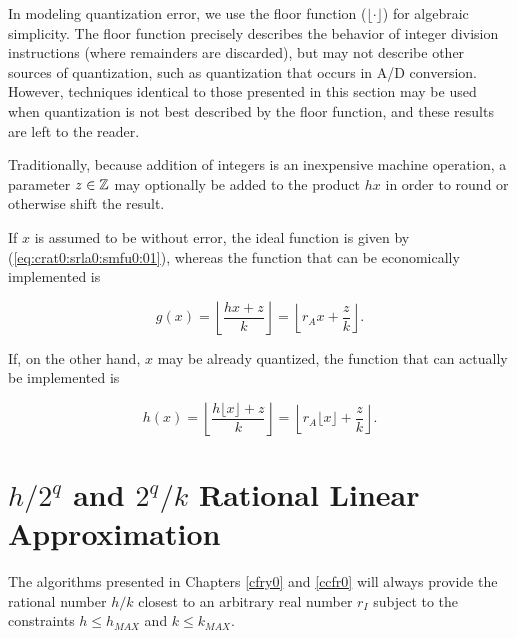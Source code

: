 In modeling quantization error, we use the floor function
($\lfloor\cdot\rfloor$)
for algebraic simplicity.  The floor function precisely 
describes the behavior of integer division instructions (where 
remainders are discarded), but may not describe other sources of 
quantization, such as quantization that occurs in A/D conversion.
However, techniques identical to those presented in this
section may be used when quantization is not best described 
by the floor function, and these results are left to the reader.

Traditionally, because addition of integers is an inexpensive
machine operation, a parameter $z \in {\mathbb{Z}}$ may optionally 
be added to the product $hx$ in order to round or otherwise
shift the result.

If $x$ is assumed to be without error, the ideal function is
given by (\ref{eq:crat0:srla0:smfu0:01}), whereas the function
that can be economically implemented is

\begin{equation}
\label{eq:crat0:srla0:smfu0:02}
g(x) = \left\lfloor \frac{hx + z}{k} \right\rfloor
=
\left\lfloor r_A x + \frac{z}{k} \right\rfloor .
\end{equation}

If, on the other hand, $x$ may be already quantized,
the function that can actually be implemented is

\begin{equation}
\label{eq:crat0:srla0:smfu0:03}
h(x) = \left\lfloor \frac{h \lfloor x \rfloor + z}{k} \right\rfloor
=
\left\lfloor r_A \lfloor x \rfloor + \frac{z}{k} \right\rfloor .
\end{equation}



\section[\protect\mbox{\protect$h/2^q$} and  \protect\mbox{\protect$2^q/k$} Rational Linear Approximation]
        {\protect\mbox{\protect\boldmath$h/2^q$} and \protect\mbox{\protect\boldmath$2^q/k$} Rational Linear Approximation}
\label{crat0:shqq0}

The algorithms presented in
Chapters \cfryzeroxrefhyphen\ref{cfry0} and \ccfrzeroxrefhyphen\ref{ccfr0}
will always provide the rational number $h/k$ closest to
an arbitrary real number $r_I$ subject to the constraints
$h \leq h_{MAX}$ and $k \leq k_{MAX}$.

